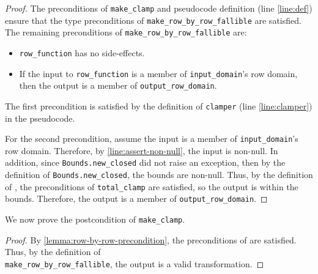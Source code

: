 \documentclass{article}
\begin{document}
\begin{proof}
    \label{lemma:row-by-row-precondition}
    The preconditions of \texttt{make\_clamp} and pseudocode definition (line \ref{line:def}) ensure that the type preconditions of \texttt{make\_row\_by\_row\_fallible} are satisfied.
    The remaining preconditions of \texttt{make\_row\_by\_row\_fallible} are:
    \begin{itemize}
        \item \texttt{row\_function} has no side-effects.
        \item If the input to \texttt{row\_function} is a member of \texttt{input\_domain}'s row domain, then the output is a member of \texttt{output\_row\_domain}.
    \end{itemize}

    The first precondition is satisfied by the definition of \texttt{clamper} (line \ref{line:clamper}) in the pseudocode.

    For the second precondition, assume the input is a member of \texttt{input\_domain}'s row domain.
    Therefore, by \ref{line:assert-non-null}, the input is non-null.
    In addition, since \texttt{Bounds.new\_closed} did not raise an exception, then by the definition of \texttt{Bounds.new\_closed}, the bounds are non-null.
    Thus, by the definition of , the preconditions of \texttt{total\_clamp} are satisfied, so the output is within the bounds.
    Therefore, the output is a member of \texttt{output\_row\_domain}.
\end{proof}

We now prove the postcondition of \texttt{make\_clamp}.
\begin{proof}
By \ref{lemma:row-by-row-precondition}, the preconditions of  are satisfied.
Thus, by the definition of \\\texttt{make\_row\_by\_row\_fallible}, the output is a valid transformation.
\end{proof}
\end{document}
